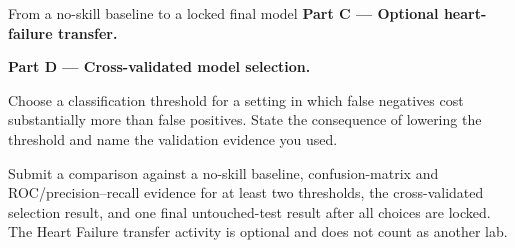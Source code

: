 \begin{labproject}{From a no-skill baseline to a locked final model}
\medskip\noindent\textbf{Part C --- Optional heart-failure transfer.}\par








\medskip\noindent\textbf{Part D --- Cross-validated model selection.}\par






\begin{decisionmemo}
Choose a classification threshold for a setting in which false negatives cost substantially more than false positives. State the consequence of lowering the threshold and name the validation evidence you used.
\end{decisionmemo}
\end{labproject}

\begin{labdeliverable}
Submit a comparison against a no-skill baseline, confusion-matrix and ROC/precision--recall evidence for at least two thresholds, the cross-validated selection result, and one final untouched-test result after all choices are locked. The Heart Failure transfer activity is optional and does not count as another lab.
\end{labdeliverable}
